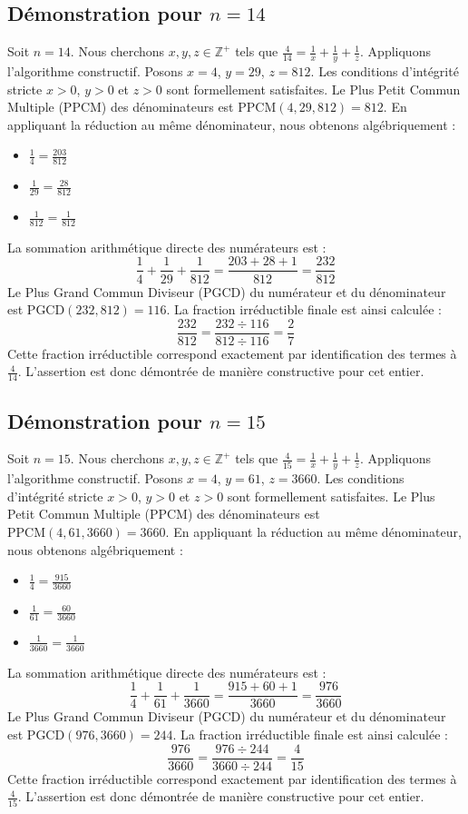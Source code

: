 \documentclass[11pt,a4paper]{article}
\begin{document}
\subsection{Démonstration pour $n = 14$}
Soit $n = 14$. Nous cherchons $x, y, z \in \mathbb{Z}^{+}$ tels que $\frac{4}{14} = \frac{1}{x} + \frac{1}{y} + \frac{1}{z}$.
Appliquons l'algorithme constructif. Posons $x = 4$, $y = 29$, $z = 812$.
Les conditions d'intégrité stricte $x > 0$, $y > 0$ et $z > 0$ sont formellement satisfaites.
Le Plus Petit Commun Multiple (PPCM) des dénominateurs est $\text{PPCM}(4, 29, 812) = 812$.
En appliquant la réduction au même dénominateur, nous obtenons algébriquement :
\begin{itemize}
    \item $\frac{1}{4} = \frac{203}{812}$
    \item $\frac{1}{29} = \frac{28}{812}$
    \item $\frac{1}{812} = \frac{1}{812}$
\end{itemize}
La sommation arithmétique directe des numérateurs est :
$$ \frac{1}{4} + \frac{1}{29} + \frac{1}{812} = \frac{203 + 28 + 1}{812} = \frac{232}{812} $$
Le Plus Grand Commun Diviseur (PGCD) du numérateur et du dénominateur est $\text{PGCD}(232, 812) = 116$.
La fraction irréductible finale est ainsi calculée :
$$ \frac{232}{812} = \frac{232 \div 116}{812 \div 116} = \frac{2}{7} $$
Cette fraction irréductible correspond exactement par identification des termes à $\frac{4}{14}$. L'assertion est donc démontrée de manière constructive pour cet entier.

\subsection{Démonstration pour $n = 15$}
Soit $n = 15$. Nous cherchons $x, y, z \in \mathbb{Z}^{+}$ tels que $\frac{4}{15} = \frac{1}{x} + \frac{1}{y} + \frac{1}{z}$.
Appliquons l'algorithme constructif. Posons $x = 4$, $y = 61$, $z = 3660$.
Les conditions d'intégrité stricte $x > 0$, $y > 0$ et $z > 0$ sont formellement satisfaites.
Le Plus Petit Commun Multiple (PPCM) des dénominateurs est $\text{PPCM}(4, 61, 3660) = 3660$.
En appliquant la réduction au même dénominateur, nous obtenons algébriquement :
\begin{itemize}
    \item $\frac{1}{4} = \frac{915}{3660}$
    \item $\frac{1}{61} = \frac{60}{3660}$
    \item $\frac{1}{3660} = \frac{1}{3660}$
\end{itemize}
La sommation arithmétique directe des numérateurs est :
$$ \frac{1}{4} + \frac{1}{61} + \frac{1}{3660} = \frac{915 + 60 + 1}{3660} = \frac{976}{3660} $$
Le Plus Grand Commun Diviseur (PGCD) du numérateur et du dénominateur est $\text{PGCD}(976, 3660) = 244$.
La fraction irréductible finale est ainsi calculée :
$$ \frac{976}{3660} = \frac{976 \div 244}{3660 \div 244} = \frac{4}{15} $$
Cette fraction irréductible correspond exactement par identification des termes à $\frac{4}{15}$. L'assertion est donc démontrée de manière constructive pour cet entier.
\end{document}

